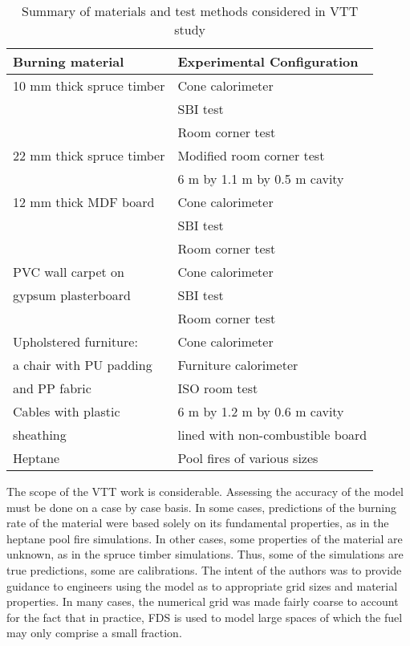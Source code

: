 \begin{table}[t]
\begin{center}
\caption{Summary of materials and test methods considered in VTT study \cite{Hietaniemi:1}} \label{VTTwork} \vspace{0.1in}
\begin{tabular}{|l|l|}
\hline Burning material          & Experimental Configuration  \\ \hline \hline
10 mm thick spruce timber &  Cone calorimeter \\
                          &  SBI test         \\
                          &  Room corner test  \\ \hline
22 mm thick spruce timber & Modified room corner test \\
                          & 6 m by 1.1 m by 0.5 m cavity  \\ \hline
12 mm thick MDF board     & Cone calorimeter \\
                          & SBI test \\
                          & Room corner test \\  \hline
PVC wall carpet on        &  Cone calorimeter \\
gypsum plasterboard       &  SBI test \\
                          &  Room corner test \\ \hline
Upholstered furniture:    &  Cone calorimeter \\
a chair with PU padding   &  Furniture calorimeter \\
and PP fabric             &  ISO room test \\ \hline
Cables with plastic       &  6 m by 1.2 m by 0.6 m cavity \\
sheathing                 &  lined  with non-combustible board \\ \hline Heptane                   & Pool fires of various sizes \\ \hline
\end{tabular}
\end{center}
\end{table}

The scope of the VTT work is considerable. Assessing the accuracy of the model must be done on a case by case basis. In some cases, predictions of
the burning rate of the material were based solely on its fundamental properties, as in the heptane pool fire simulations. In other cases, some
properties of the material are unknown, as in the spruce timber simulations. Thus, some of the simulations are true predictions, some are
calibrations. The intent of the authors was to provide guidance to engineers using the model as to appropriate grid sizes and material properties. In
many cases, the numerical grid was made fairly coarse to account for the fact that in practice, FDS is used to model large spaces of which the fuel
may only comprise a small fraction.


